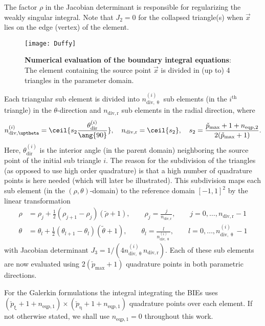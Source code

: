 The factor $\rho$ in the Jacobian determinant is responsible for regularizing the weakly singular integral. Note that $J_2=0$ for the collapsed triangle(s) when $\vec{x}$ lies on the edge (vertex) of the element. 
\begin{figure}
	\centering
	\texttt{[image: Duffy]}
	\caption{\textbf{Numerical evaluation of the boundary integral equations}: The element containing the source point $\vec{x}$ is divided in (up to) 4 triangles in the parameter domain.}
	\label{Fig3:Duffy}
\end{figure}
Each triangular sub element is divided into $n_{\mathrm{div},\uptheta}^{(i)}$ sub elements (in the $i^{\mathrm{th}}$ triangle) in the $\theta$-direction and $n_{\mathrm{div},\mathrm{r}}$ sub elements in the radial direction, where
\begin{equation*}
	n_{\mathrm{div},\uptheta}^{(i)} = \ceil{s_2\frac{\theta_{\mathrm{dir}}^{(i)}}{\ang{90}}},\quad n_{\mathrm{div},\mathrm{r}} = \ceil{s_2},\quad s_2 = \frac{\check{p}_{\mathrm{max}}+1+n_{\mathrm{eqp},2}}{2(\check{p}_{\mathrm{max}}+1)}.
\end{equation*}
Here, $\theta_{\mathrm{dir}}^{(i)}$ is the interior angle (in the parent domain) neighboring the source point of the initial sub triangle $i$. The reason for the subdivision of the triangles (as opposed to use high order quadrature) is that a high number of quadrature points is here needed (which will later be illustrated). This subdivision maps each sub element (in the $(\rho,\theta)$-domain) to the reference domain $[-1,1]^2$ by the linear transformation
\begin{equation}
\begin{aligned}
	\rho &= \rho_j + \frac12(\rho_{j+1}-\rho_j)(\tilde{\rho}+1),\qquad\rho_j = \frac{j}{n_{\mathrm{div},\mathrm{r}}},\qquad j=0,\dots,n_{\mathrm{div},\mathrm{r}}-1\\
	\theta &= \theta_l + \frac12(\theta_{l+1}-\theta_l)(\tilde{\theta}+1),\qquad\theta_l=\frac{l}{n_{\mathrm{div},\uptheta}^{(i)}},\qquad l=0,\dots,n_{\mathrm{div},\uptheta}^{(i)}-1
\end{aligned}
\end{equation}
with Jacobian determinant $J_3=1/(4n_{\mathrm{div},\uptheta}^{(i)}n_{\mathrm{div},\mathrm{r}})$. Each of these sub elements are now evaluated using $2(\check{p}_{\mathrm{max}}+1)$ quadrature points in both parametric directions.

For the Galerkin formulations the integral integrating the BIEs uses $(\check{p}_\upxi+1+n_{\mathrm{eqp},1})\times(\check{p}_\upeta+1+n_{\mathrm{eqp},1})$ quadrature points over each element. If not otherwise stated, we shall use $n_{\mathrm{eqp},1}=0$ throughout this work.

